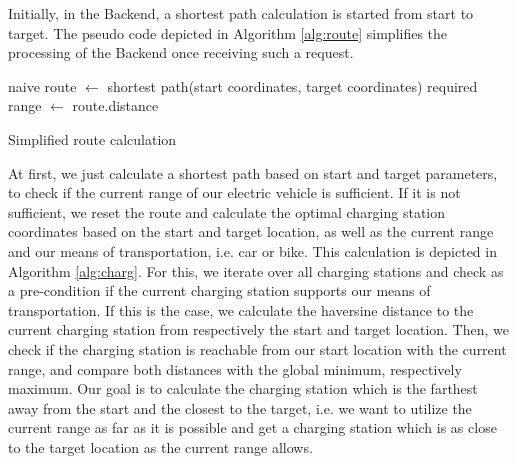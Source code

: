 \documentclass[a4paper]{article}
\begin{document}
Initially, in the Backend, a shortest path calculation is started from start to target.
The pseudo code depicted in Algorithm \ref{alg:route} simplifies the processing of the Backend once receiving such a request.\par\bigskip
\begin{algorithm}[H]
naive route $\leftarrow$  shortest path(start coordinates, target coordinates)\;
required range $\leftarrow$ route.distance\;
 \caption{Simplified route calculation}
 \label{alg:route}
\end{algorithm}\par\bigskip
At first, we just calculate a shortest path based on start and target parameters, to check if the current range of our electric vehicle is sufficient.
If it is not sufficient, we reset the route and calculate the optimal charging station coordinates based on the start and target location, as well as the current range and our means of transportation, i.e. car or bike.
This calculation is depicted in Algorithm \ref{alg:charg}. 
For this, we iterate over all charging stations and check as a pre-condition if the current charging station supports our means of transportation.
If this is the case, we calculate the haversine distance to the current charging station from respectively the start and target location.
Then, we check if the charging station is reachable from our start location with the current range, and compare both distances with the global minimum, respectively maximum. 
Our goal is to calculate the charging station which is the farthest away from the start and the closest to the target, i.e. we want to utilize the current range as far as it is possible and get a charging station which is as close to the target location as the current range allows.
\end{document}
